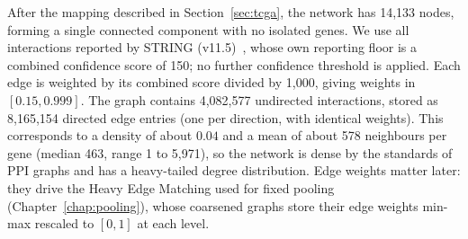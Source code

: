 After the mapping described in Section~\ref{sec:tcga}, the network has 14{,}133 nodes, forming a
single connected component with no isolated genes. We use all interactions reported by STRING
(v11.5)~, whose own reporting floor is a combined confidence score of 150;
no further confidence threshold is applied. Each edge is weighted by its combined score divided by
1{,}000, giving weights in $[0.15, 0.999]$. The graph contains 4{,}082{,}577 undirected
interactions, stored as 8{,}165{,}154 directed edge entries (one per direction, with identical
weights). This corresponds to a density of about $0.04$ and a mean of about 578 neighbours per gene
(median 463, range 1 to 5{,}971), so the network is dense by the standards of PPI graphs and has a
heavy-tailed degree distribution. Edge weights matter later: they drive the Heavy Edge Matching used
for fixed pooling (Chapter~\ref{chap:pooling}), whose coarsened graphs store their edge weights
min-max rescaled to $[0, 1]$ at each level.
